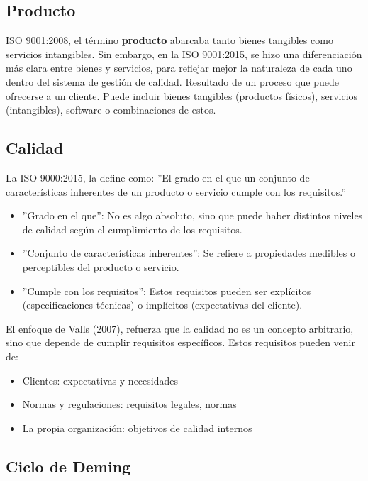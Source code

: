 \documentclass[a4paper,oneside,11pt]{article}
\begin{document}
\subsection{Producto}

ISO 9001:2008, el término \textbf{producto} abarcaba tanto bienes tangibles como servicios intangibles. Sin embargo, en la ISO 9001:2015, se hizo una diferenciación más clara entre bienes y servicios, para reflejar mejor la naturaleza de cada uno dentro del sistema de gestión de calidad. Resultado de un proceso que puede ofrecerse a un cliente.
Puede incluir bienes tangibles (productos físicos), servicios (intangibles), software o combinaciones de estos.

\subsection{Calidad}

La ISO 9000:2015, la define como: 
''El grado en el que un conjunto de características inherentes de un producto o servicio cumple con los requisitos.''
\begin{itemize}
    \item ''Grado en el que'': No es algo absoluto, sino que puede haber distintos niveles de calidad según el cumplimiento de los requisitos.
    \item ''Conjunto de características inherentes'': Se refiere a propiedades medibles o perceptibles del producto o servicio.
    \item ''Cumple con los requisitos'': Estos requisitos pueden ser explícitos (especificaciones técnicas) o implícitos (expectativas del cliente).
\end{itemize}

El enfoque de Valls (2007), refuerza que la calidad no es un concepto arbitrario, sino que depende de cumplir requisitos específicos. Estos requisitos pueden venir de:
\begin{itemize}
    \item Clientes: expectativas y necesidades
    \item Normas y regulaciones: requisitos legales, normas
    \item La propia organización: objetivos de calidad internos 
\end{itemize}

\subsection{Ciclo de Deming}
\end{document}
